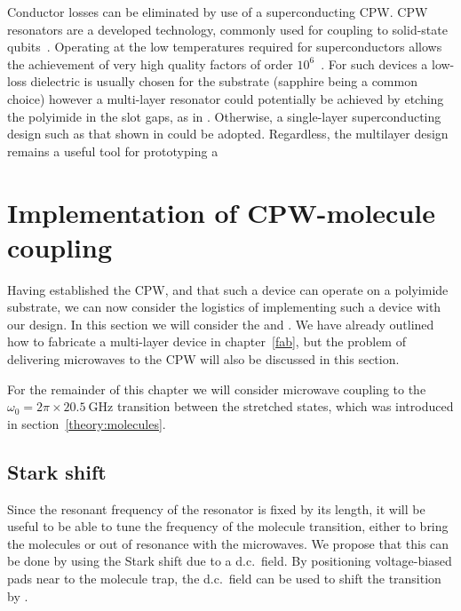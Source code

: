 Conductor losses can be eliminated by use of a superconducting CPW. CPW
resonators are a developed technology, commonly used for coupling to
solid-state qubits~\cite{Wallraff2004}. Operating at the low temperatures
required for superconductors allows the achievement of very high quality
factors of order $10^6$~\cite{doi:10.1063/1.3552890, Day2003}. For such devices
a low-loss dielectric is usually chosen for the substrate (sapphire being a
common choice) however a multi-layer resonator could potentially be achieved by
etching the polyimide in the slot gaps, as in . Otherwise, a
single-layer superconducting design such as that shown in
 could be adopted. Regardless, the multilayer design
remains a useful tool for prototyping a 


\section{Implementation of CPW-molecule coupling}
\label{mws:integrating}

Having established the CPW, and that such a device can operate on a polyimide
substrate, we can now consider the logistics of implementing such a device
with our design. In this section we will consider the  and . We have already outlined how to fabricate a multi-layer device
in chapter~\ref{fab}, but the problem of delivering microwaves to the CPW
will also be discussed in this section.

For the remainder of this chapter we will consider microwave coupling to the
$\omega_0 = 2\pi \times \SI{20.5}{\giga\hertz}$ transition between the
stretched states, which was introduced in section~\ref{theory:molecules}.

\subsection{Stark shift}

Since the resonant frequency of the resonator is fixed by its length, it will
be useful to be able to tune the frequency of the molecule transition, either
to bring the molecules  or out of resonance with the microwaves. We
propose that this can be done by using the Stark shift due to a d.c.~field.
By positioning voltage-biased pads near to the molecule trap, the d.c.~field
can be used to shift the transition by .

